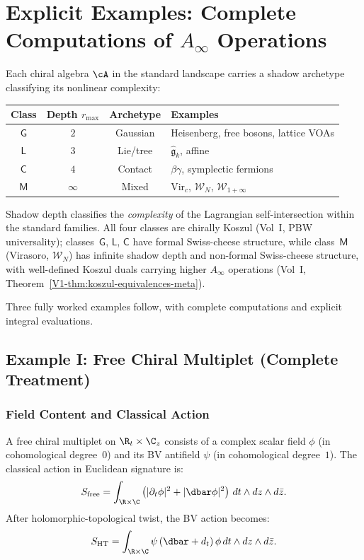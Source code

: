 \section{Explicit Examples: Complete Computations of $A_\infty$ Operations}

\begin{construction}
Each chiral algebra $\cA$ in the standard landscape carries a shadow archetype classifying its nonlinear complexity:
\begin{center}
\begin{tabular}{cccl}
\toprule
Class & Depth $r_{\max}$ & Archetype & Examples \\
\midrule
$\mathsf{G}$ & $2$ & Gaussian & Heisenberg, free bosons, lattice VOAs \\
$\mathsf{L}$ & $3$ & Lie/tree & $\hat{\mathfrak{g}}_k$, affine \\
$\mathsf{C}$ & $4$ & Contact & $\beta\gamma$, symplectic fermions \\
$\mathsf{M}$ & $\infty$ & Mixed & $\mathrm{Vir}_c$, $\mathcal{W}_N$, $\mathcal{W}_{1+\infty}$ \\
\bottomrule
\end{tabular}
\end{center}
Shadow depth classifies the \emph{complexity} of the Lagrangian self-intersection within the standard families. All four classes are chirally Koszul (Vol~I, PBW universality); classes~$\mathsf{G}$, $\mathsf{L}$, $\mathsf{C}$ have formal Swiss-cheese structure, while class~$\mathsf{M}$ (Virasoro, $\mathcal{W}_N$) has infinite shadow depth and non-formal Swiss-cheese structure, with well-defined Koszul duals carrying higher $A_\infty$ operations (Vol~I, Theorem~\ref*{V1-thm:koszul-equivalences-meta}).
\end{construction}

Three fully worked examples follow, with complete computations and explicit integral evaluations.
\subsection{Example I: Free Chiral Multiplet (Complete Treatment)}

\subsubsection{Field Content and Classical Action}
A free chiral multiplet on $\R_t \times \C_z$ consists of a complex scalar field $\phi$ (in cohomological degree~$0$) and its BV antifield $\psi$ (in cohomological degree~$1$). The classical action in Euclidean signature is:
\begin{equation}
S_{\text{free}} = \int_{\R \times \C} \left( |\partial_t \phi|^2 + |\dbar \phi|^2 \right) \, dt \wedge dz \wedge d\bar{z}.
\end{equation}
After holomorphic-topological twist, the BV action becomes:
\begin{equation}
S_{\text{HT}} = \int_{\R \times \C} \psi \,(\dbar + d_t)\, \phi \, dt \wedge dz \wedge d\bar{z}.
\end{equation}
